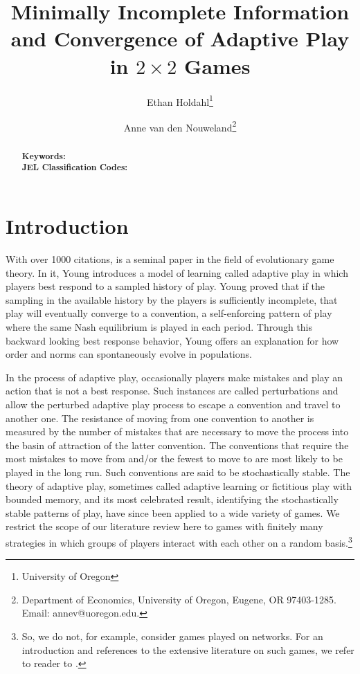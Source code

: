 \documentclass[11.5pt]{article}
\title{Minimally Incomplete Information and Convergence of Adaptive Play in $2\times 2$ Games}
\author{Ethan Holdahl\thanks{University of Oregon} \and Anne van den Nouweland\thanks{Department of Economics, University of Oregon, Eugene, OR 97403-1285. Email: annev@uoregon.edu.}}
\begin{document}
\maketitle 

\begin{abstract}

\noindent \textbf{Keywords:}\\
\noindent \textbf{JEL Classification Codes: } \\

\end{abstract}



%
\newpage

\section{Introduction}
With over 1000 citations, \cite{young1993evolution} is a seminal paper in the field of evolutionary game theory. In it, Young introduces a model of learning called adaptive play in which players best respond to a sampled history of play. Young proved that if the sampling in the available history by the players is sufficiently incomplete, that play will eventually converge to a convention, a self-enforcing pattern of play where the same Nash equilibrium is played in each period. Through this backward looking best response behavior, Young offers an explanation for how order and norms can spontaneously evolve in populations.

In the process of adaptive play, occasionally players make mistakes and play an action that is not a best response. Such instances are called perturbations and allow the perturbed adaptive play process to escape a convention and travel to another one. The resistance of moving from one convention to another is measured by the number of mistakes that are necessary to move the process into the basin of attraction of the latter convention. The conventions that require the most mistakes to move from and/or the fewest to move to are most likely to be played in the long run. Such conventions are said to be stochastically stable. The theory of adaptive play, sometimes called adaptive learning or fictitious play with bounded memory, and its most celebrated result, identifying the 
stochastically stable patterns of play, have since been applied to a wide variety of games. We restrict the scope of our literature review here to games with finitely many strategies 
in which groups of players interact with each other on a random basis.\footnote{So, we do not, for example, consider games played on networks. For an introduction and references to the extensive  literature on such games, we refer to reader to \cite{WALLACE2015327}.
}
\end{document}
